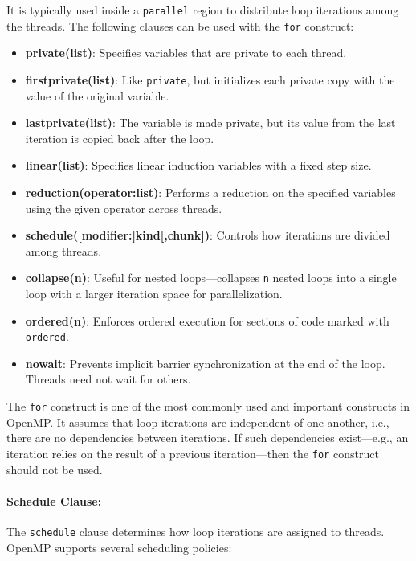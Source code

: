 \documentclass[12pt]{book}
\begin{document}
It is typically used inside a \texttt{parallel} region to distribute loop iterations among the threads. The following clauses can be used with the \texttt{for} construct:

\begin{itemize}
    \item \textbf{private(list)}: Specifies variables that are private to each thread.
    \item \textbf{firstprivate(list)}: Like \texttt{private}, but initializes each private copy with the value of the original variable.
    \item \textbf{lastprivate(list)}: The variable is made private, but its value from the last iteration is copied back after the loop.
    \item \textbf{linear(list)}: Specifies linear induction variables with a fixed step size.
    \item \textbf{reduction(operator:list)}: Performs a reduction on the specified variables using the given operator across threads.
    \item \textbf{schedule([modifier:]kind[,chunk])}: Controls how iterations are divided among threads.
    \item \textbf{collapse(n)}: Useful for nested loops—collapses \texttt{n} nested loops into a single loop with a larger iteration space for parallelization.
    \item \textbf{ordered(n)}: Enforces ordered execution for sections of code marked with \texttt{ordered}.
    \item \textbf{nowait}: Prevents implicit barrier synchronization at the end of the loop. Threads need not wait for others.
\end{itemize}

The \texttt{for} construct is one of the most commonly used and important constructs in OpenMP. It assumes that loop iterations are independent of one another, i.e., there are no dependencies between iterations. If such dependencies exist—e.g., an iteration relies on the result of a previous iteration—then the \texttt{for} construct should not be used.

\paragraph{Schedule Clause:}  
The \texttt{schedule} clause determines how loop iterations are assigned to threads. OpenMP supports several scheduling policies:
\end{document}
